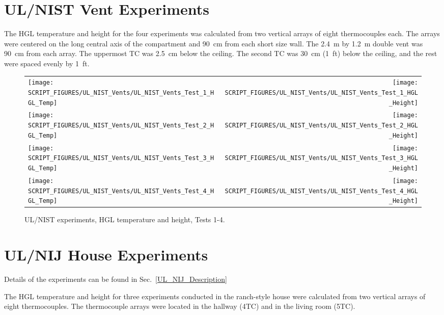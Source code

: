 \section{UL/NIST Vent Experiments}

The HGL temperature and height for the four experiments was calculated from two vertical arrays of eight thermocouples each. The arrays were centered on the long central axis of the compartment and 90~cm from each short size wall. The 2.4~m by 1.2~m double vent was 90~cm from each array. The uppermost TC was 2.5~cm below the ceiling. The second TC was 30~cm (1~ft) below the ceiling, and the rest were spaced evenly by 1~ft.

\newpage

\begin{figure}[p]
\begin{tabular*}{\textwidth}{l@{\extracolsep{\fill}}r}
\texttt{[image: SCRIPT\_FIGURES/UL\_NIST\_Vents/UL\_NIST\_Vents\_Test\_1\_HGL\_Temp]} &
\texttt{[image: SCRIPT\_FIGURES/UL\_NIST\_Vents/UL\_NIST\_Vents\_Test\_1\_HGL\_Height]} \\
\texttt{[image: SCRIPT\_FIGURES/UL\_NIST\_Vents/UL\_NIST\_Vents\_Test\_2\_HGL\_Temp]} &
\texttt{[image: SCRIPT\_FIGURES/UL\_NIST\_Vents/UL\_NIST\_Vents\_Test\_2\_HGL\_Height]} \\
\texttt{[image: SCRIPT\_FIGURES/UL\_NIST\_Vents/UL\_NIST\_Vents\_Test\_3\_HGL\_Temp]} &
\texttt{[image: SCRIPT\_FIGURES/UL\_NIST\_Vents/UL\_NIST\_Vents\_Test\_3\_HGL\_Height]} \\
\texttt{[image: SCRIPT\_FIGURES/UL\_NIST\_Vents/UL\_NIST\_Vents\_Test\_4\_HGL\_Temp]} &
\texttt{[image: SCRIPT\_FIGURES/UL\_NIST\_Vents/UL\_NIST\_Vents\_Test\_4\_HGL\_Height]}
\end{tabular*}
\caption[UL/NIST experiments, HGL temperature and height, Tests 1-4]
{UL/NIST experiments, HGL temperature and height, Tests 1-4.}
\label{UL_NIST_HGL}
\end{figure}

\clearpage

\section{UL/NIJ House Experiments}

Details of the experiments can be found in Sec.~\ref{UL_NIJ_Description}

The HGL temperature and height for three experiments conducted in the ranch-style house were calculated from two vertical arrays of eight thermocouples. The thermocouple arrays were located in the hallway (4TC) and in the living room (5TC).


